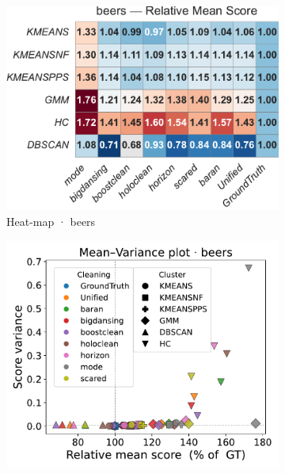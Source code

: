 \documentclass[10pt]{article} %
\numberwithin{equation}{section}
\begin{document}
\begin{figure}[htbp]
  \centering
  \footnotesize
  \setlength{\abovecaptionskip}{4pt}
  \setlength{\belowcaptionskip}{0pt}

  \begin{subfigure}{0.32\linewidth}
    \centering
    \includegraphics[width=\linewidth]{figures/5.3.1graph/heatmap_rel_beers.pdf}
    \caption{Heat-map · beers}
  \end{subfigure}\hfill
  \begin{subfigure}{0.32\linewidth}
    \centering
    \includegraphics[width=\linewidth]{figures/5.3.1graph/mean_var_scatter_beers.pdf}

\end{subfigure}
\end{figure}
\end{document}
